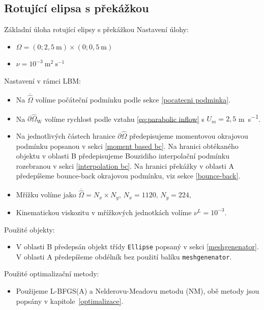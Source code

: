 \subsection{Rotující elipsa s překážkou}
\begin{uloha}{Základní úloha rotující elipsy s překážkou}\label{ulo:2}
	\vspace{2mm}
	Nastavení úlohy:
	\begin{itemize}
		\item $ \Omega=(0 ; 2{,}5 \mathrm{~m}) \times(0 ; 0{,}5 \mathrm{~m})$
		\item $ \nu=10^{-3} \mathrm{~m}^{2} \mathrm{~s}^{-1}$
	\end{itemize} 
	Nastavení v rámci LBM:
	\begin{itemize}
		\item Na $ \overline{\hat{\Omega}} $ volíme počáteční podmínku podle sekce \ref{pocatecni podminka}.
		\item Na $ \partial \hat{\Omega}_{\mathrm{W}} $ volíme rychlost podle vztahu \eqref{eq:parabolic inflow} s $ U_m = 2{,}5 $ \si{m s^{-1}}.
		\item Na jednotlivých částech hranice $ \partial \hat{\Omega}$ předepisujeme momentovou okrajovou podmínku popsanou v sekci \ref{moment based bc}. Na hranici obtékaného objektu v oblasti B předepisujeme Bouzidiho interpolační podmínku rozebranou v sekci \ref{interpolation bc}. Na hranici překážky v oblasti A předepíšeme bounce-back okrajovou podmínku, viz sekce \ref{bounce-back}.
		\item Mřížku volíme jako $\overline{\hat{\Omega}} = N_{x} \times N_{y}$, $N_{x} = 1120, \, N_{y} = 224$,
		\item Kinematickou viskozitu v mřížkových jednotkách volíme $\nu^{L} = 10^{-3} $.
	\end{itemize}
	Použité objekty:
	\begin{itemize}
		\item V oblasti B předepsán objekt třídy \texttt{Ellipse} popsaný v sekci \ref{meshgenenator}. V oblasti A předepíšeme obdélník bez použití balíku \texttt{meshgenenator}.
	\end{itemize} 
	Použité optimalizační metody:
	\begin{itemize}
		\item Použijeme L-BFGS(A) a Nelderovu-Meadovu metodu (NM), obě metody jsou popsány v kapitole~\ref{optimalizace}.
	\end{itemize} 
\end{uloha}

